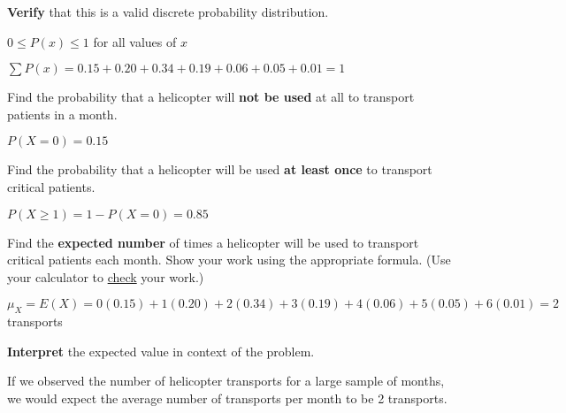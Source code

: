 \documentclass[noanswers]{exam}
\begin{document}
\begin{questions} 
		
	\question  \textbf{Verify} that this is a valid discrete probability distribution.
	
	\begin{solution}[\stretch{1}]
	
	$0\leq P(x)\leq 1$ for all values of $x$
	
	\vspace{3mm}

	$\sum P(x)=0.15+0.20+0.34+0.19+0.06+0.05+0.01=1$

	\vspace{2mm}

	\end{solution}
	
	\question Find the probability that a helicopter will \textbf{not be used} at all to transport patients in a month.
	
	\begin{solution}[\stretch{1}]

	$P(X=0)=0.15$
	
	\vspace{2mm}
	\end{solution}
	
	\question Find the probability that a helicopter will be used \textbf{at least once} to transport critical patients.
	
	\begin{solution}[\stretch{1}]

	$P(X\geq 1)=1-P(X=0)=0.85$
	
	\vspace{2mm}
	\end{solution}
	
	\question Find the \textbf{expected number} of times a helicopter will be used to transport critical patients each month. Show your work using the appropriate formula. (Use your calculator to \underline{check} your work.)
	
	\begin{solution}[\stretch{1}]
	\vspace{1mm}
	$\mu_X=E(X)=0(0.15)+1(0.20)+2(0.34)+3(0.19)+4(0.06)+5(0.05)+6(0.01)=2$ transports
	
	\vspace{2mm}
	\end{solution}
	
	\question \textbf{Interpret} the expected value in context of the problem.
	
	\begin{solution}[\stretch{1}]
	\vspace{1mm}
	If we observed the number of helicopter transports for a large sample of months, we would expect the average number of transports per month to be 2 transports.
	

\end{solution}
\end{questions}
\end{document}
